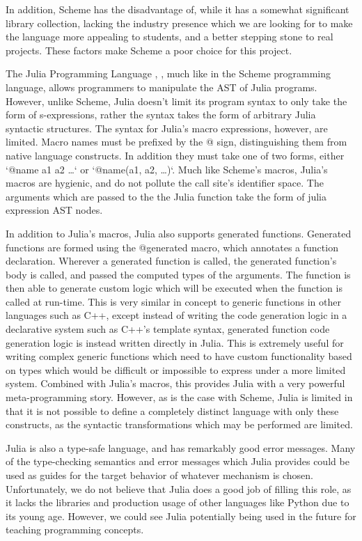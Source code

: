 In addition, Scheme has the disadvantage of, while it has a somewhat significant
library collection, lacking the industry presence which we are looking for to
make the language more appealing to students, and a better stepping stone to
real projects. These factors make Scheme a poor choice for this project.

The Julia Programming Language \cite{juliapaper}, \cite{juliaweb}, much like in
the Scheme programming language, allows programmers to manipulate the AST of
Julia programs. However, unlike Scheme, Julia doesn’t limit its program syntax
to only take the form of s-expressions, rather the syntax takes the form of
arbitrary Julia syntactic structures. The syntax for Julia’s macro expressions,
however, are limited. Macro names must be prefixed by the @ sign, distinguishing
them from native language constructs. In addition they must take one of two
forms, either `@name a1 a2 …` or `@name(a1, a2, …)`. Much like Scheme’s macros,
Julia’s macros are hygienic, and do not pollute the call site’s identifier
space. The arguments which are passed to the the Julia function take the form of
julia expression AST nodes.

In addition to Julia’s macros, Julia also supports generated functions.
Generated functions are formed using the @generated macro, which annotates a
function declaration. Wherever a generated function is called, the generated
function’s body is called, and passed the computed types of the arguments. The
function is then able to generate custom logic which will be executed when the
function is called at run-time. This is very similar in concept to generic
functions in other languages such as C++, except instead of writing the code
generation logic in a declarative system such as C++’s template syntax,
generated function code generation logic is instead written directly in Julia.
This is extremely useful for writing complex generic functions which need to
have custom functionality based on types which would be difficult or impossible
to express under a more limited system. Combined with Julia’s macros, this
provides Julia with a very powerful meta-programming story. However, as is the
case with Scheme, Julia is limited in that it is not possible to define a
completely distinct language with only these constructs, as the syntactic
transformations which may be performed are limited.

Julia is also a type-safe language, and has remarkably good error messages. Many
of the type-checking semantics and error messages which Julia provides could be
used as guides for the target behavior of whatever mechanism is chosen.
Unfortunately, we do not believe that Julia does a good job of filling this
role, as it lacks the libraries and production usage of other languages like
Python due to its young age. However, we could see Julia potentially being used
in the future for teaching programming concepts.


